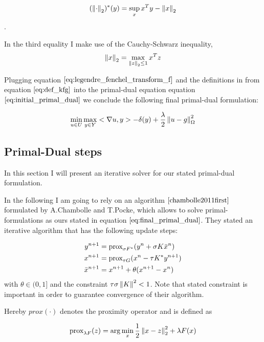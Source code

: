 \begin{equation}
	(\left\lVert\cdot\right\rVert_2)^*(y) = \sup_x x^T y - \left\lVert x\right\rVert_2 \nonumber
\end{equation}. 

In the third equality I make use of the Cauchy-Schwarz inequality, 
\begin{equation}
	\left\lVert x\right\rVert_2 = \max_{\left\lVert z\right\rVert_2 \leq 1} x^T z
\end{equation}


Plugging equation $\ref{eq:legendre_fenchel_transform_f}$ and the definitions in from equation $\ref{eq:def_kfg}$ into the primal-dual equation equation $\ref{eq:initial_primal_dual}$ we conclude the following final primal-dual formulation:

\begin{equation}
\min_{u \in U} \max_{y \in Y} <\nabla u, y> - \delta(y) + \frac{\lambda}{2}\left\lVert u - g\right\rVert^2_{\Omega}
\label{eq:final_primal_dual}
\end{equation}


\subsection{Primal-Dual steps}
In this section I will present an iterative solver for our stated primal-dual formulation.

In the following I am going to rely on an algorithm $\cite{chambolle2011first}$ formulated by A.Chambolle and T.Pocke, which allows to solve primal-formulations as ours stated in equation $\ref{eq:final_primal_dual}$.
They stated an iterative algorithm that has the following update steps:

\begin{align}
	y^{n+1} &= \text{prox}_{\sigma F^*}(y^n + \sigma K \bar{x}^n) \nonumber \\
	x^{n+1} &= \text{prox}_{\tau G}(x^n - \tau K^* y^{n+1}) \\
	\bar{x}^{n+1} &= x^{n+1} + \theta(x^{n+1} - x^n)
\label{eq:update_rules_plain}	
\end{align}
with $\theta \in (0, 1]$ and the constraint $\tau \sigma \left\lVert K\right\rVert^2 < 1$. Note that stated constraint is important in order to guarantee convergence of their algorithm.

Hereby $prox(\cdot)$ denotes the proximity operator and is defined as 

\begin{equation}
	\text{prox}_{\lambda F}(z) = \arg \min_x \frac{1}{2} \left\lVert x - z\right\rVert_2^2 + \lambda F(x)
\end{equation}

